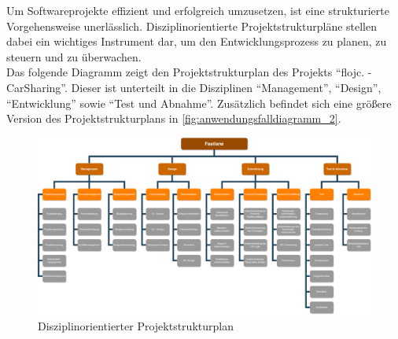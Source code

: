 Um Softwareprojekte effizient und erfolgreich umzusetzen, ist eine strukturierte Vorgehensweise unerlässlich.
Disziplinorientierte Projektstrukturpläne stellen dabei ein wichtiges Instrument dar, um den Entwicklungsprozess zu planen,
zu steuern und zu überwachen. \\
Das folgende Diagramm zeigt den Projektstrukturplan des Projekts \enquote{flojc. - CarSharing}.
Dieser ist unterteilt in die Disziplinen \enquote{Management}, \enquote{Design}, \enquote{Entwicklung} sowie \enquote{Test und Abnahme}.
Zusätzlich befindet sich eine größere Version des Projektstrukturplans in \autoref{fig:anwendungsfalldiagramm_2}.

\begin{figure}[H]
    \label{fig:anwendungsfalldiagramm}
    \centering
    \includegraphics[width = \textwidth]{pictures/Projektstrukturplan}
    \caption{Disziplinorientierter Projektstrukturplan}
\end{figure}